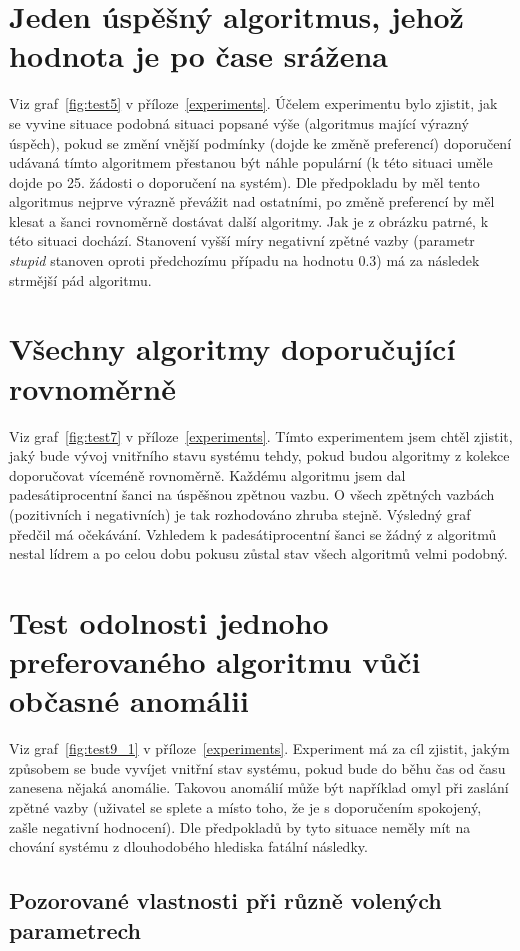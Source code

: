 \documentclass[thesis=M,czech]{FITthesis}[2014/05/07]
\begin{document}
\section{Jeden úspěšný algoritmus, jehož hodnota je po čase srážena}
Viz graf~\ref{fig:test5} v příloze~\ref{experiments}. Účelem experimentu bylo zjistit, jak se vyvine situace podobná situaci popsané výše (algoritmus mající výrazný úspěch), pokud se změní vnější podmínky (dojde ke změně preferencí) doporučení udávaná tímto algoritmem přestanou být náhle populární (k této situaci uměle dojde po 25. žádosti o doporučení na systém). Dle předpokladu by měl tento algoritmus nejprve výrazně převážit nad ostatními, po změně preferencí by měl klesat a šanci rovnoměrně dostávat další algoritmy. Jak je z obrázku patrné, k této situaci dochází. Stanovení vyšší míry negativní zpětné vazby (parametr \emph{stupid} stanoven oproti předchozímu případu na hodnotu $0.3$) má za následek strmější pád algoritmu.

\section{Všechny algoritmy doporučující rovnoměrně}
Viz graf~\ref{fig:test7} v příloze~\ref{experiments}. Tímto experimentem jsem chtěl zjistit, jaký bude vývoj vnitřního stavu systému tehdy, pokud budou algoritmy z kolekce doporučovat víceméně rovnoměrně. Každému algoritmu jsem dal padesátiprocentní šanci na úspěšnou zpětnou vazbu. O všech zpětných vazbách (pozitivních i negativních) je tak rozhodováno zhruba stejně. Výsledný graf předčil má očekávání. Vzhledem k padesátiprocentní šanci se žádný z algoritmů nestal lídrem a po celou dobu pokusu zůstal stav všech algoritmů velmi podobný. 

\section{Test odolnosti jednoho preferovaného algoritmu vůči občasné anomálii}
Viz graf~\ref{fig:test9_1} v příloze~\ref{experiments}. Experiment má za cíl zjistit, jakým způsobem se bude vyvíjet vnitřní stav systému, pokud bude do běhu čas od času zanesena nějaká anomálie. Takovou anomálií může být například omyl při zaslání zpětné vazby (uživatel se splete a místo toho, že je s doporučením spokojený, zašle negativní hodnocení). Dle předpokladů by tyto situace neměly mít na chování systému z dlouhodobého hlediska fatální následky.

\subsection{Pozorované vlastnosti při různě volených parametrech}
\end{document}
